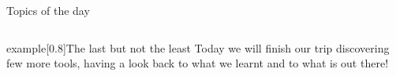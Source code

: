 
\begin{frame}
    \titlepage
\end{frame}
\begin{frame}[label=toc,plain,noframenumbering]{Topics of the day}
    \medskip
    \begin{columns}[t]
        \begin{column}{.45\textwidth}
            \hspace*{4mm}
            \begin{minipage}[t][0.45\textheight]{\textwidth}
                \tableofcontents[sections={1-3}]
            \end{minipage}
        \end{column}
        \begin{column}{.45\textwidth}
            \begin{minipage}[t][0.45\textheight]{\textwidth}
                \tableofcontents[sections={4-}]
            \end{minipage}
        \end{column}
    \end{columns}
    \vspace{6mm}
    \begin{varblock}{example}[0.8\textwidth]{The last but not the least}
        Today we will finish our trip discovering few more tools, having a look back to what we learnt and to what is out there!
    \end{varblock}
\end{frame}
